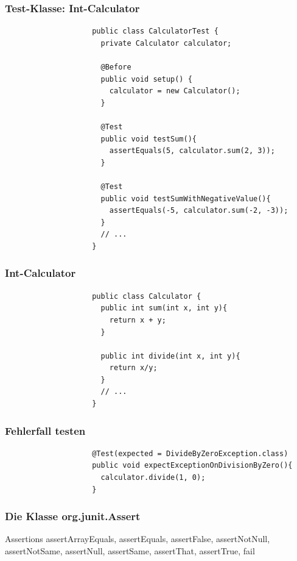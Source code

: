\documentclass{beamer}
\begin{document}
			\begin{frame}[fragile]
				\frametitle{Test-Klasse: Int-Calculator}

				\begin{lstlisting}
					public class CalculatorTest {
					  private Calculator calculator;

					  @Before
					  public void setup() {
					    calculator = new Calculator();
					  }

					  @Test
					  public void testSum(){
					    assertEquals(5, calculator.sum(2, 3));
					  }

					  @Test
					  public void testSumWithNegativeValue(){
					    assertEquals(-5, calculator.sum(-2, -3));
					  }
					  // ...
					}
				\end{lstlisting}
			\end{frame}
		
			\begin{frame}[fragile]
				\frametitle{Int-Calculator}

				\begin{lstlisting}
					public class Calculator {
					  public int sum(int x, int y){
					    return x + y;
					  }

					  public int divide(int x, int y){
					    return x/y;
					  }
					  // ...
					}
				\end{lstlisting}
			\end{frame}

			\begin{frame}[fragile]
				\frametitle{Fehlerfall testen}

				\begin{lstlisting}
					@Test(expected = DivideByZeroException.class)
					public void expectExceptionOnDivisionByZero(){
					  calculator.divide(1, 0);
					}
				\end{lstlisting}
			\end{frame}

			\begin{frame}
				\frametitle{Die Klasse org.junit.Assert}
				\begin{block}{Assertions}
					assertArrayEquals, assertEquals, assertFalse, assertNotNull, assertNotSame, assertNull, assertSame, assertThat, assertTrue, fail
				\end{block}
			\end{frame}

\end{document}
